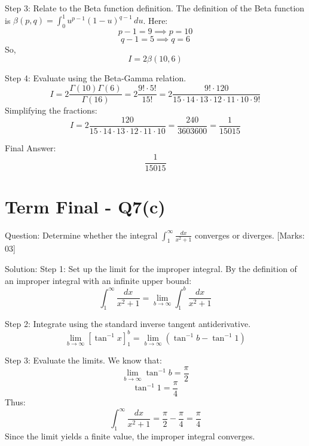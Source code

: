 \documentclass[11pt, a4paper]{article}
\begin{document}
Step 3: Relate to the Beta function definition.
The definition of the Beta function is $\beta(p, q) = \int_{0}^{1} u^{p-1} (1-u)^{q-1} \, du$.
Here:
\[
p - 1 = 9 \implies p = 10
\]
\[
q - 1 = 5 \implies q = 6
\]
So,
\[
I = 2 \beta(10, 6)
\]

Step 4: Evaluate using the Beta-Gamma relation.
\[
I = 2 \frac{\Gamma(10)\Gamma(6)}{\Gamma(16)} = 2 \frac{9! \cdot 5!}{15!} = 2 \frac{9! \cdot 120}{15 \cdot 14 \cdot 13 \cdot 12 \cdot 11 \cdot 10 \cdot 9!}
\]
Simplifying the fractions:
\[
I = 2 \frac{120}{15 \cdot 14 \cdot 13 \cdot 12 \cdot 11 \cdot 10} = \frac{240}{3603600} = \frac{1}{15015}
\]

Final Answer:
\[
\boxed{\frac{1}{15015}}
\]





\section*{Term Final - Q7(c)}

Question:
Determine whether the integral $\int_{1}^{\infty} \frac{dx}{x^2 + 1}$ converges or diverges. [Marks: 03]

Solution:
Step 1: Set up the limit for the improper integral.
By the definition of an improper integral with an infinite upper bound:
\[
\int_{1}^{\infty} \frac{dx}{x^2 + 1} = \lim_{b \to \infty} \int_{1}^{b} \frac{dx}{x^2 + 1}
\]

Step 2: Integrate using the standard inverse tangent antiderivative.
\[
\lim_{b \to \infty} \left[ \tan^{-1} x \right]_{1}^{b} = \lim_{b \to \infty} \left( \tan^{-1} b - \tan^{-1} 1 \right)
\]

Step 3: Evaluate the limits.
We know that:
\[
\lim_{b \to \infty} \tan^{-1} b = \frac{\pi}{2}
\]
\[
\tan^{-1} 1 = \frac{\pi}{4}
\]
Thus:
\[
\int_{1}^{\infty} \frac{dx}{x^2 + 1} = \frac{\pi}{2} - \frac{\pi}{4} = \frac{\pi}{4}
\]
Since the limit yields a finite value, the improper integral converges.
\end{document}
